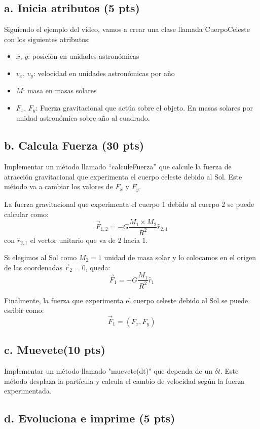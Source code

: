 \documentclass{article}
\begin{document}
\subsection*{a. Inicia atributos (5 pts)}
Siguiendo el ejemplo del vídeo, vamos a crear una clase llamada CuerpoCeleste con 
los siguientes atributos:
\begin{itemize}
    \item $x$, $y$: posición en unidades astronómicas
    \item $v_x$, $v_y$: velocidad en unidades astronómicas por año
    \item $M$: masa en masas solares
    \item $F_x$, $F_y$: Fuerza gravitacional que actúa sobre el objeto. En masas
    solares por unidad astronómica sobre año al cuadrado. 
\end{itemize}

\subsection*{b. Calcula Fuerza (30 pts)}

Implementar un método llamado ``calculeFuerza'' que calcule la fuerza de
atracción gravitacional que experimenta el cuerpo celeste debido al Sol. 
Este método va a 
cambiar los valores de $F_x$ y $F_y$.

La fuerza gravitacional que experimenta el cuerpo 1 debido al cuerpo 2 se puede
calcular como:
\[ \vec{F}_{1,2} = - G \frac{M_1 \times{M_2}}{R^2} \hat{r}_{2,1}\]
con $\hat{r}_{2,1}$ el vector unitario que va de 2 hacia 1.

Si elegimos al Sol como $M_2 = 1$ unidad de masa solar y lo colocamos en el origen de las coordenadas $\vec{r}_2 = 0$, queda:
\[ \vec{F}_{1} = - G \frac{M_1}{R^2} \hat{r}_{1}\]

Finalmente, la fuerza que experimenta el cuerpo celeste debido al Sol se puede esribir como:
\[ \vec{F}_1 = \left( F_x, F_y\right) \]

\subsection*{c. Muevete(10 pts)}
Implementar un método llamado "muevete(dt)" que dependa de un $\delta t$. Este método
desplaza la partícula y calcula el cambio de velocidad según la fuerza experimentada.

\subsection*{d. Evoluciona e imprime (5 pts)}
\end{document}
